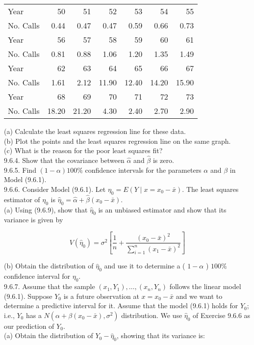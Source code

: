 \begin{center}
\begin{tabular}{|l|rrrrrr|}
\hline
Year & 50 & 51 & 52 & 53 & 54 & 55 \\
No. Calls & 0.44 & 0.47 & 0.47 & 0.59 & 0.66 & 0.73 \\
\hline
Year & 56 & 57 & 58 & 59 & 60 & 61 \\
No. Calls & 0.81 & 0.88 & 1.06 & 1.20 & 1.35 & 1.49 \\
\hline
Year & 62 & 63 & 64 & 65 & 66 & 67 \\
No. Calls & 1.61 & 2.12 & 11.90 & 12.40 & 14.20 & 15.90 \\
\hline
Year & 68 & 69 & 70 & 71 & 72 & 73 \\
No. Calls & 18.20 & 21.20 & 4.30 & 2.40 & 2.70 & 2.90 \\
\hline
\end{tabular}
\end{center}

(a) Calculate the least squares regression line for these data.\\
(b) Plot the points and the least squares regression line on the same graph.\\
(c) What is the reason for the poor least squares fit?\\
9.6.4. Show that the covariance between $\hat{\alpha}$ and $\hat{\beta}$ is zero.\\
9.6.5. Find $(1-\alpha) 100 \%$ confidence intervals for the parameters $\alpha$ and $\beta$ in Model (9.6.1).\\
9.6.6. Consider Model (9.6.1). Let $\eta_{0}=E\left(Y \mid x=x_{0}-\bar{x}\right)$. The least squares estimator of $\eta_{0}$ is $\hat{\eta}_{0}=\hat{\alpha}+\hat{\beta}\left(x_{0}-\bar{x}\right)$.\\
(a) Using (9.6.9), show that $\hat{\eta}_{0}$ is an unbiased estimator and show that its variance is given by

$$
V\left(\hat{\eta}_{0}\right)=\sigma^{2}\left[\frac{1}{n}+\frac{\left(x_{0}-\bar{x}\right)^{2}}{\sum_{i=1}^{n}\left(x_{1}-\bar{x}\right)^{2}}\right]
$$

(b) Obtain the distribution of $\hat{\eta}_{0}$ and use it to determine a ( $1-\alpha$ ) $100 \%$ confidence interval for $\eta_{0}$.\\
9.6.7. Assume that the sample $\left(x_{1}, Y_{1}\right), \ldots,\left(x_{n}, Y_{n}\right)$ follows the linear model (9.6.1). Suppose $Y_{0}$ is a future observation at $x=x_{0}-\bar{x}$ and we want to determine a predictive interval for it. Assume that the model (9.6.1) holds for $Y_{0}$; i.e., $Y_{0}$ has a $N\left(\alpha+\beta\left(x_{0}-\bar{x}\right), \sigma^{2}\right)$ distribution. We use $\hat{\eta}_{0}$ of Exercise 9.6.6 as our prediction of $Y_{0}$.\\
(a) Obtain the distribution of $Y_{0}-\hat{\eta}_{0}$, showing that its variance is:

